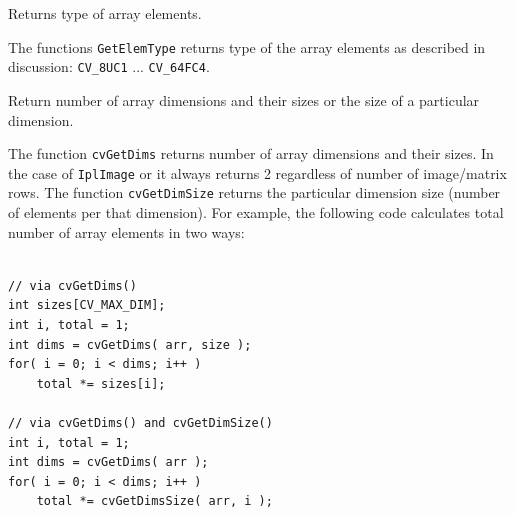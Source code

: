 Returns type of array elements.


\begin{description}
\end{description}


The functions \texttt{GetElemType} returns type of the array elements
as described in  discussion: \texttt{CV\_8UC1}
... \texttt{CV\_64FC4}.


\label{GetDims, GetDimSize}

Return number of array dimensions and their sizes or the size of a particular dimension.

\ifC
{}

\begin{description}
\end{description}


The function \texttt{cvGetDims} returns number of array dimensions and
their sizes. In the case of \texttt{IplImage} or  it always
returns 2 regardless of number of image/matrix rows. The function
\texttt{cvGetDimSize} returns the particular dimension size (number of
elements per that dimension). For example, the following code calculates
total number of array elements in two ways:

\begin{lstlisting}

// via cvGetDims()
int sizes[CV_MAX_DIM];
int i, total = 1;
int dims = cvGetDims( arr, size );
for( i = 0; i < dims; i++ )
    total *= sizes[i];

// via cvGetDims() and cvGetDimSize()
int i, total = 1;
int dims = cvGetDims( arr );
for( i = 0; i < dims; i++ )
    total *= cvGetDimsSize( arr, i );

\end{lstlisting}
\else
{}

